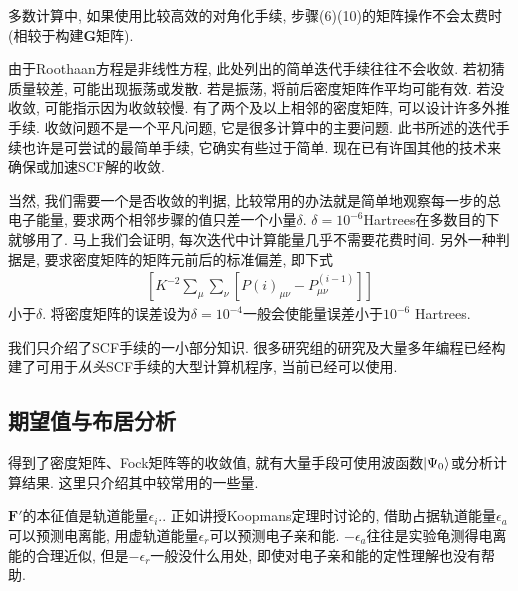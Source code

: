 多数计算中, 如果使用比较高效的对角化手续, 步骤(6)(10)的矩阵操作不会太费时(相较于构建$\mathbf{G}$矩阵).

由于Roothaan方程是非线性方程, 此处列出的简单迭代手续往往不会收敛. 若初猜质量较差, 可能出现振荡或发散. 若是振荡, 将前后密度矩阵作平均可能有效. 若没收敛, 可能指示因为收敛较慢. 有了两个及以上相邻的密度矩阵, 可以设计许多外推手续. 收敛问题不是一个平凡问题, 它是很多计算中的主要问题. 此书所述的迭代手续也许是可尝试的最简单手续, 它确实有些过于简单. 现在已有许国其他的技术来确保或加速SCF解的收敛.

当然, 我们需要一个是否收敛的判据, 比较常用的办法就是简单地观察每一步的总电子能量, 要求两个相邻步骤的值只差一个小量$\delta$. $\delta=10^{-6}$Hartrees在多数目的下就够用了. 马上我们会证明, 每次迭代中计算能量几乎不需要花费时间. 另外一种判据是, 要求密度矩阵的矩阵元前后的标准偏差, 即下式
\begin{align*}
\left[ K^{-2}\sum_\mu\sum_\nu[P{(i)}_{\mu\nu}-P^{(i-1)}_{\mu\nu} ] \right]
\end{align*} 
小于$\delta$. 将密度矩阵的误差设为$\delta=10^{-4}$一般会使能量误差小于$10^{-6}$ Hartrees.

我们只介绍了SCF手续的一小部分知识. 很多研究组的研究及大量多年编程已经构建了可用于\emph{从头}SCF手续的大型计算机程序, 当前已经可以使用.
\subsection{期望值与布居分析}
得到了密度矩阵、Fock矩阵等的收敛值, 就有大量手段可使用波函数$\Ket{\Psi_0}$或分析计算结果. 这里只介绍其中较常用的一些量.

$\mathbf{F'}$的本征值是轨道能量$\epsilon_i$.. 正如讲授Koopmans定理时讨论的, 借助占据轨道能量$\epsilon_a$可以预测电离能, 用虚轨道能量$\epsilon_r$可以预测电子亲和能. $-\epsilon_a$往往是实验龟测得电离能的合理近似, 但是$-\epsilon_r$一般没什么用处, 即使对电子亲和能的定性理解也没有帮助.

